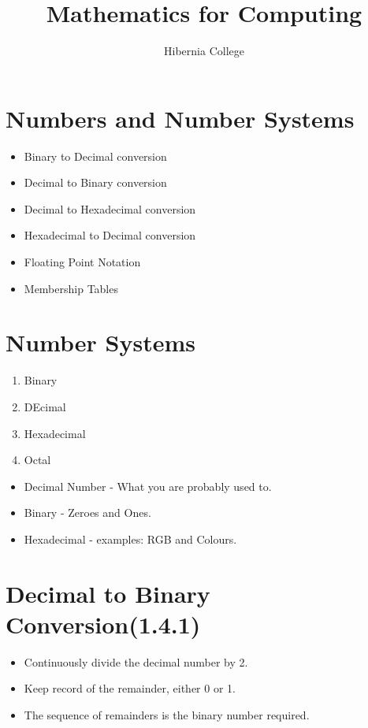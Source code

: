 \documentclass[12pt]{article}
\title{Mathematics for Computing}
\author{Hibernia College}
\begin{document}
\maketitle

\section{Numbers and Number Systems}
\begin{itemize}
\item Binary to Decimal conversion
\item Decimal to Binary conversion
\item Decimal to Hexadecimal conversion
\item Hexadecimal to Decimal conversion
\item Floating Point Notation
\item Membership Tables
\end{itemize}
\section{Number Systems}
\begin{enumerate}
\item Binary
\item DEcimal
\item Hexadecimal
\item Octal
\end{enumerate}
\begin{itemize}
\item Decimal Number - What you are probably used to.
\item Binary - Zeroes and Ones.
\item Hexadecimal - examples: RGB and Colours.
\end{itemize}




\section{Decimal to Binary Conversion(1.4.1)}

\Large{\begin{itemize}
\item Continuously divide the decimal number by 2.
\item Keep record of the remainder, either 0 or 1.
\item The sequence of remainders is the binary number required.
\end{itemize}}
\end{document}
